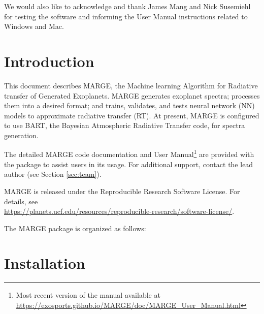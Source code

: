 \documentclass[letterpaper, 12pt]{article}
\begin{document}
\noindent We would also like to acknowledge and thank James Mang and 
Nick Susemiehl for testing the software and informing the User Manual 
instructions related to Windows and Mac.

\section{Introduction}
\label{sec:theory}

\noindent This document describes MARGE, the Machine learning Algorithm for Radiative 
transfer of Generated Exoplanets.  MARGE generates exoplanet spectra; processes 
them into a desired format; and trains, validates, and tests neural network (NN)
models to approximate radiative transfer (RT).  At present, MARGE is configured 
to use BART, the Bayesian Atmospheric Radiative Transfer code, for spectra 
generation.

The detailed MARGE code documentation and User Manual\footnote{Most recent version of the manual available at 
\href{https://exosports.github.io/MARGE/doc/MARGE_User_Manual.html}{https://exosports.github.io/MARGE/doc/MARGE\_User\_Manual.html}} 
are provided with the package to assist users in its usage. 
For additional support, contact the lead author (see Section \ref{sec:team}).

MARGE is released under the Reproducible Research Software License.  
For details, see \\
\href{https://planets.ucf.edu/resources/reproducible-research/software-license/}{https://planets.ucf.edu/resources/reproducible-research/software-license/}.
\newline

\noindent The MARGE package is organized as follows: \newline
\noindent{}
\vspace{0.7cm}

\section{Installation}
\label{sec:installation}
\end{document}
